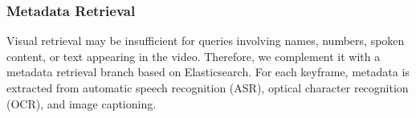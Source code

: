 \documentclass[runningheads]{llncs}
\begin{document}


\subsubsection{Metadata Retrieval}
\label{sec:metadata-retrieval}

Visual retrieval may be insufficient for queries involving names, numbers,
spoken content, or text appearing in the video. Therefore, we complement it
with a metadata retrieval branch based on Elasticsearch. For each keyframe,
metadata is extracted from automatic speech recognition (ASR), optical
character recognition (OCR), and image captioning.
\end{document}
